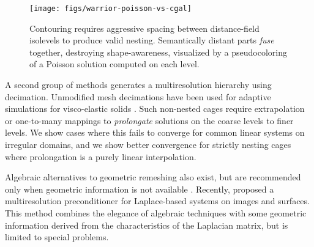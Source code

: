 \begin{figure}[b]
  \texttt{[image: figs/warrior-poisson-vs-cgal]}
  \caption{Contouring requires aggressive spacing between distance-field
  isolevels to produce valid nesting. Semantically distant parts \emph{fuse}
  together, destroying shape-awareness, visualized by a pseudocoloring of a
  Poisson solution computed on each level.} 
  \label{fig:warrior-poisson}
\end{figure}

%

A second group of methods generates a multiresolution hierarchy using decimation. Unmodified mesh decimations \cite{Garland:1997:SSU} have been used for adaptive
simulations for visco-elastic solids \cite{Debunne:2001:DRD}.
%
Such non-nested cages require extrapolation or one-to-many mappings to
\emph{prolongate} solutions on the coarse levels to finer levels.
%
We show cases where this fails to converge for common linear systems on
irregular domains, and we show better convergence for strictly nesting cages where
prolongation is a purely linear interpolation.

Algebraic alternatives to geometric remeshing also exist,
but are recommended only when geometric information is not available
\cite{falgout06}.
%
Recently, \cite{Krishnan:2013:EPL} proposed a
multiresolution preconditioner for Laplace-based systems on images and
surfaces.
%
This method combines the elegance of algebraic techniques with some geometric
information derived from the characteristics of the Laplacian matrix, but is
limited to special problems.

